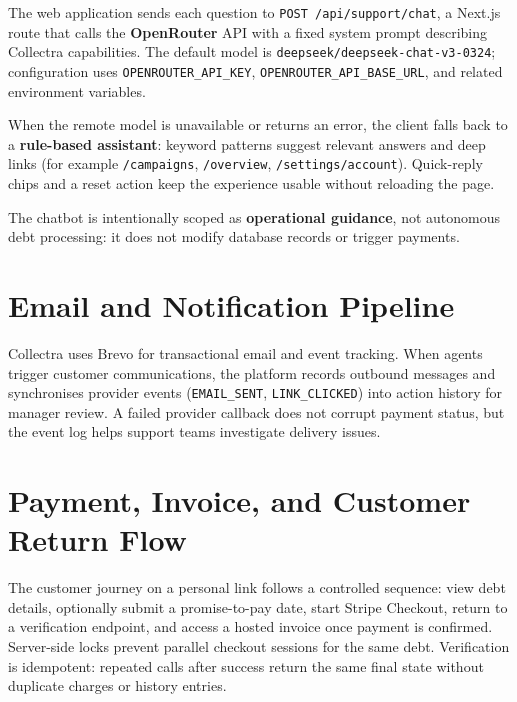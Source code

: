 \documentclass[12pt,a4paper]{report}
\begin{document}
The web application sends each question to \texttt{POST /api/support/chat}, a
Next.js route that calls the \textbf{OpenRouter} API with a fixed system prompt
describing Collectra capabilities.
The default model is \texttt{deepseek/deepseek-chat-v3-0324}; configuration uses
\texttt{OPENROUTER\_API\_KEY}, \texttt{OPENROUTER\_API\_BASE\_URL}, and related
environment variables.

When the remote model is unavailable or returns an error, the client falls back to a
\textbf{rule-based assistant}: keyword patterns suggest relevant answers and deep
links (for example \texttt{/campaigns}, \texttt{/overview}, \texttt{/settings/account}).
Quick-reply chips and a reset action keep the experience usable without reloading the
page.

The chatbot is intentionally scoped as \textbf{operational guidance}, not autonomous
debt processing: it does not modify database records or trigger payments.

\section{Email and Notification Pipeline}

Collectra uses Brevo for transactional email and event tracking.
When agents trigger customer communications, the platform records outbound messages
and synchronises provider events (\texttt{EMAIL\_SENT}, \texttt{LINK\_CLICKED}) into
action history for manager review.
A failed provider callback does not corrupt payment status, but the event log helps
support teams investigate delivery issues.

\section{Payment, Invoice, and Customer Return Flow}

The customer journey on a personal link follows a controlled sequence: view debt
details, optionally submit a promise-to-pay date, start Stripe Checkout, return to a
verification endpoint, and access a hosted invoice once payment is confirmed.
Server-side locks prevent parallel checkout sessions for the same debt.
Verification is idempotent: repeated calls after success return the same final state
without duplicate charges or history entries.

\end{document}
